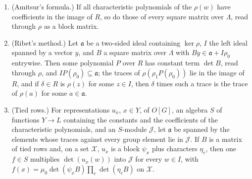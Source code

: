 \begin{proposition}\label{prop:ribet-algebra}
\begin{enumerate}[label=\textup{(\alph*)}]
\item (Amitsur's formula.) If all characteristic polynomials of the $\rho(w)$ have coefficients in the image of $R$, so do those of every square matrix over $\Lambda$, read through $\rho$ as a block matrix.
\item (Ribet's method.) Let $\mathfrak a$ be a two-sided ideal containing $\ker\rho$, $I$ the left ideal spanned by a vector $y$, and $B$ a square matrix over $\Lambda$ with $By\in\mathfrak a+I\rho_0$ entrywise. Then some polynomial $P$ over $R$
has constant term $\det B$, read through $\rho$, and $IP(\rho_0)\subseteq\mathfrak a$; the traces of $\rho(\rho_1P(\rho_0))$ lie in the image of $R$, and if $\delta\in R$ is $\rho(z)$ for some $z\in I$, then $\delta$ times such a trace is the trace of
$\rho(a)$ for some $a\in\mathfrak a$.
\item (Tied rows.) For representations $u_x$, $x\in Y$, of $O[G]$, an algebra $S$ of functions $Y\to L$ containing the constants and the coefficients of the characteristic polynomials, and an $S$-module $\mathcal J$, let
$\mathfrak a$ be spanned by the elements whose traces against every group element lie in $\mathcal J$. If $B$ is a matrix of tied rows and, on a set $\mathcal X$, $u_x$ is a block $\psi_x$ plus characters $\eta_e$, then one $f\in S$
multiplies $\det(u_x(w))$ into $\mathcal J$ for every $w\in I$, with $f(x)=\mu_0\det(\psi_xB)\prod_e\det(\eta_eB)$ on $\mathcal X$.
\end{enumerate}
\end{proposition}

